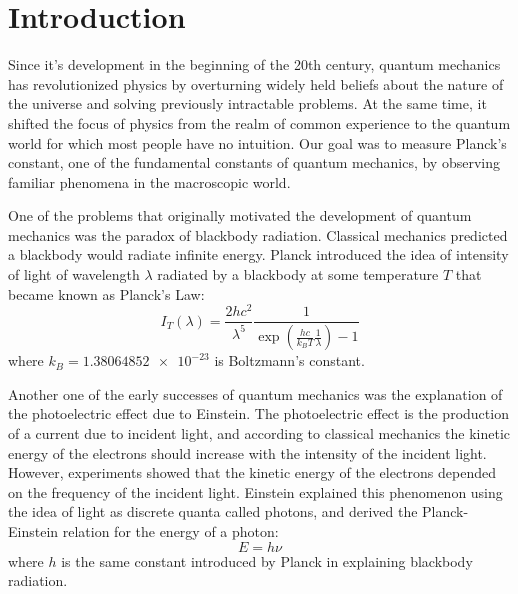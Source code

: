 \documentclass{lab}
\begin{document}
\maketitle

\begin{abstract}
  In this paper we present two methods for measuring Planck's constant $h$. The
  first, based on earlier work~\parencite{zhou}, measures the stopping voltage
  of LEDs to determine the energy of the photons produced and fits the result
  from many LEDs to the equation $E = h\nu$. The second is novel, and involves
  measuring the radiation spectrum of the sun using a photodiode and light
  filters, and fitting it to the blackbody radiation curve predicted by Planck's
  Law. We measured $h$ to be \num{6.2781 +- .12064 e-34} and \num{7.7868 +-
    .60495 e-34} using the two methods respectively.
\end{abstract}

\section{Introduction}
\label{Sec:Intro}

Since it's development in the beginning of the 20th century, quantum mechanics
has revolutionized physics by overturning widely held beliefs about the nature
of the universe and solving previously intractable problems. At the same time,
it shifted the focus of physics from the realm of common experience to the
quantum world for which most people have no intuition. Our goal was to measure
Planck's constant, one of the fundamental constants of quantum mechanics, by
observing familiar phenomena in the macroscopic world.

One of the problems that originally motivated the development of quantum
mechanics was the paradox of blackbody radiation. Classical mechanics predicted
a blackbody would radiate infinite energy. Planck introduced the idea of
intensity of light of wavelength $\lambda$ radiated by a blackbody at some temperature
$T$ that became known as Planck's Law:
\begin{equation}
  I_T(\lambda) = \frac{2hc^2}{\lambda^5} \frac{1}{\exp(\frac{hc}{k_B T} \frac{1}{\lambda})-1}
\end{equation}
where $k_B = \num{1.38064852e-23}$ is Boltzmann's constant.

Another one of the early successes of quantum mechanics was the explanation of
the photoelectric effect due to Einstein. The photoelectric effect is the
production of a current due to incident light, and according to classical
mechanics the kinetic energy of the electrons should increase with the intensity
of the incident light. However, experiments showed that the kinetic energy of
the electrons depended on the frequency of the incident light. Einstein
explained this phenomenon using the idea of light as discrete quanta called
photons, and derived the Planck-Einstein relation for the energy of a photon:
\begin{equation}
  E = h\nu
\end{equation}
where $h$ is the same constant introduced by Planck in explaining blackbody
radiation.
\end{document}

